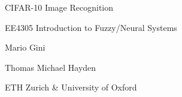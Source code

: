     \begin{titlepage}

    \begin{center}
    \vspace*{6cm}
    \centering
    \Huge
    { CIFAR-10 Image Recognition }
    \vspace{2cm}

    \Huge
    {EE4305 Introduction to Fuzzy/Neural Systems}
    \vspace{0.5cm}
    
    \Large
    {Mario Gini
    	
    Thomas Michael Hayden\\
	}
	\vspace{1cm}
	\Large
	{ETH Zurich \& University of Oxford}
   
    \end{center}
    \end{titlepage}